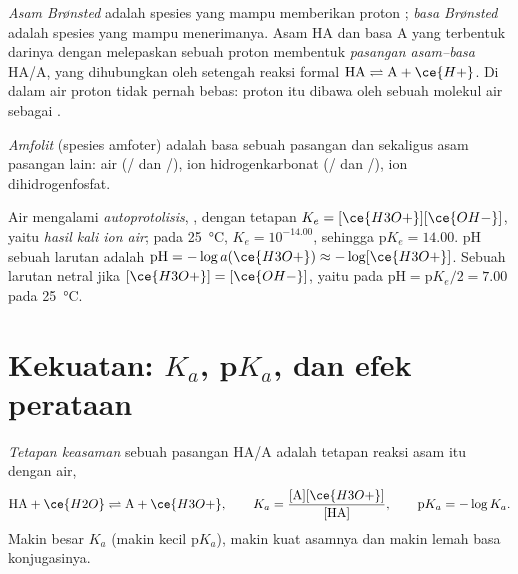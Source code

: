 \begin{definition}\label{def:b1:predominant-reaction:bronsted}
\emph{Asam Brønsted} adalah spesies yang mampu
memberikan proton ; \emph{basa Brønsted}
adalah spesies yang mampu menerimanya. Asam HA dan basa A yang
terbentuk darinya dengan melepaskan sebuah proton membentuk
\emph{pasangan asam--basa} HA/A, yang
dihubungkan oleh setengah reaksi formal $\mathrm{HA} \rightleftharpoons
\mathrm{A} + \ce{H+}$. Di dalam air proton tidak pernah bebas: proton itu
dibawa oleh sebuah molekul air sebagai .
\end{definition}

\begin{definition}[Amfolit]\label{def:b1:predominant-reaction:ampholyte}
\emph{Amfolit} (spesies amfoter) adalah basa sebuah
pasangan dan sekaligus asam pasangan lain: air (/ dan
/), ion hidrogenkarbonat (/ dan
/), ion dihidrogenfosfat.
\end{definition}

\begin{definition}\label{def:b1:predominant-reaction:autoprotolysis}
Air mengalami \emph{autoprotolisis},
, dengan tetapan $K_e = [\ce{H3O+}][\ce{OH-}]$,
yaitu \emph{hasil kali ion air}; pada
\qty{25}{\celsius}, $K_e = 10^{-14.00}$, sehingga $\mathrm{p}K_e = 14.00$.
pH sebuah larutan adalah $\mathrm{pH} = -\log a(\ce{H3O+}) \approx -\log[\ce{H3O+}]$.
Sebuah larutan netral jika $[\ce{H3O+}] = [\ce{OH-}]$, yaitu pada
$\mathrm{pH} = \mathrm{p}K_e/2 = 7.00$ pada \qty{25}{\celsius}.
\end{definition}

\section{Kekuatan: \texorpdfstring{$K_a$}{Ka}, \texorpdfstring{p$K_a$}{pKa}, dan efek perataan}

\begin{definition}\label{def:b1:predominant-reaction:acidity-constant}
\emph{Tetapan keasaman} sebuah pasangan HA/A
adalah tetapan reaksi asam itu dengan air,
\[
  \mathrm{HA} + \ce{H2O} \rightleftharpoons \mathrm{A} + \ce{H3O+}, \qquad
  K_a = \frac{[\mathrm{A}][\ce{H3O+}]}{[\mathrm{HA}]}, \qquad
  \mathrm{p}K_a = -\log K_a .
\]
Makin besar $K_a$ (makin kecil $\mathrm{p}K_a$), makin kuat asamnya dan
makin lemah basa konjugasinya.
\end{definition}

